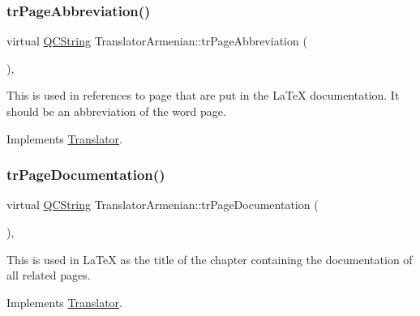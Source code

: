 \mbox{\label{class_translator_armenian_aada8fb8b79721d3363d68cada584638e}} 
\subsubsection{\texorpdfstring{trPageAbbreviation()}{trPageAbbreviation()}}
{\footnotesize\ttfamily virtual \mbox{\hyperlink{class_q_c_string}{Q\+C\+String}} Translator\+Armenian\+::tr\+Page\+Abbreviation (\begin{DoxyParamCaption}{ }\end{DoxyParamCaption})\hspace{0.3cm}{\ttfamily [inline]}, {\ttfamily [virtual]}}

This is used in references to page that are put in the La\+TeX documentation. It should be an abbreviation of the word page. 

Implements \mbox{\hyperlink{class_translator}{Translator}}.

\mbox{\label{class_translator_armenian_a1c1b21ccb230246560220f407738725b}} 
\subsubsection{\texorpdfstring{trPageDocumentation()}{trPageDocumentation()}}
{\footnotesize\ttfamily virtual \mbox{\hyperlink{class_q_c_string}{Q\+C\+String}} Translator\+Armenian\+::tr\+Page\+Documentation (\begin{DoxyParamCaption}{ }\end{DoxyParamCaption})\hspace{0.3cm}{\ttfamily [inline]}, {\ttfamily [virtual]}}

This is used in La\+TeX as the title of the chapter containing the documentation of all related pages. 

Implements \mbox{\hyperlink{class_translator}{Translator}}.

\mbox{\label{class_translator_armenian_aa534324228b233d094a84d81595db4eb}} 
